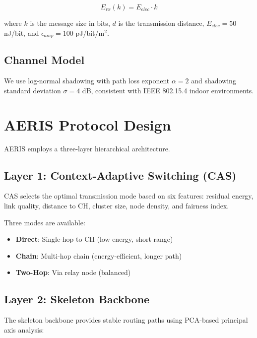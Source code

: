 \documentclass[twocolumn]{article}
\begin{document}
\begin{equation}
E_{rx}(k) = E_{elec} \cdot k
\end{equation}

where $k$ is the message size in bits, $d$ is the transmission distance,
$E_{elec} = 50$ nJ/bit, and $\epsilon_{amp} = 100$ pJ/bit/m$^2$.

\subsection{Channel Model}

We use log-normal shadowing with path loss exponent $\alpha = 2$ and
shadowing standard deviation $\sigma = 4$ dB, consistent with IEEE 802.15.4
indoor environments.

\section{AERIS Protocol Design}
\label{sec:protocol}

AERIS employs a three-layer hierarchical architecture.

\subsection{Layer 1: Context-Adaptive Switching (CAS)}

CAS selects the optimal transmission mode based on six features:
residual energy, link quality, distance to CH, cluster size, node density,
and fairness index.

Three modes are available:
\begin{itemize}
    \item \textbf{Direct}: Single-hop to CH (low energy, short range)
    \item \textbf{Chain}: Multi-hop chain (energy-efficient, longer path)
    \item \textbf{Two-Hop}: Via relay node (balanced)
\end{itemize}

\subsection{Layer 2: Skeleton Backbone}

The skeleton backbone provides stable routing paths using PCA-based
principal axis analysis:
\end{document}
